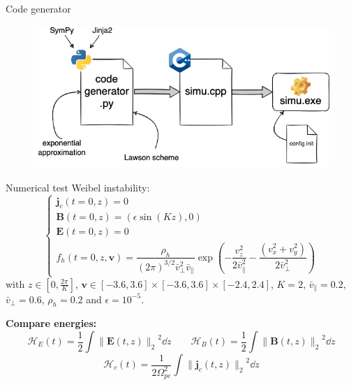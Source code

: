 \documentclass{beamer}
\newcommand{\mbold}[1]{{\textbf{\color{PLB}#1}}}
\newcommand{\Mvb}[1]{\boldsymbol{#1}}
\begin{document}
\begin{frame}{Code generator}
  
  \begin{figure}
    \includegraphics[width=\textwidth]{img/codegen}
  \end{figure}
\end{frame}

\begin{frame}{Numerical test}
  Weibel instability:
  $$
    \begin{cases}
      \Mvb{j}_c(t=0,z) = 0 \\
      \Mvb{B}(t=0,z) = \left( \epsilon \sin(Kz) , 0 \right) \\
      \Mvb{E}(t=0,z) = 0 \\
      f_h(t=0,z,\Mvb{v}) = \dfrac{\rho_h}{ (2\pi)^{3/2} \bar{v}_\perp^2 \bar{v}_\parallel }\exp( -\dfrac{v_z^2}{2\bar{v}_\parallel^2} - \dfrac{(v_x^2 + v_y^2)}{2\bar{v}_\perp^2}  )
    \end{cases}
  $$
  with $z\in[0,\frac{2\pi}{K}]$, $\Mvb{v}\in[-3.6,3.6]\times[-3.6,3.6]\times[-2.4,2.4]$, $K=2$, $\bar{v}_\parallel=0.2$, $\bar{v}_\perp = 0.6$, $\rho_h=0.2$ and $\epsilon=10^{-5}$.

  \mbold{Compare energies:}
  $$
    \mathcal{H}_E(t) = \frac{1}{2}\int {\| \Mvb{E}(t,z) \|_2}^2\dd{z}
    \qquad
    \mathcal{H}_B(t) = \frac{1}{2}\int {\| \Mvb{B}(t,z) \|_2}^2\dd{z}
  $$
  $$
    \mathcal{H}_c(t) = \frac{1}{2\Omega_{pe}^2}\int {\| \Mvb{j}_c(t,z) \|_2}^2\dd{z}
  $$
\end{frame}
\end{document}
